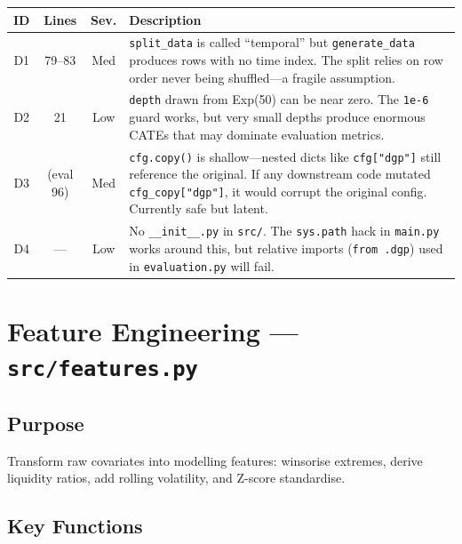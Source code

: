 \documentclass[11pt, letterpaper]{article}
\begin{document}
\begin{center}
\begin{tabularx}{\textwidth}{c c c X}
    \toprule
    \textbf{ID} & \textbf{Lines} & \textbf{Sev.} & \textbf{Description} \\
    \midrule
    D1 & 79--83 & \textcolor{medsev}{Med} &
        \texttt{split\_data} is called ``temporal'' but \texttt{generate\_data} produces rows with no time index. The split relies on row order never being shuffled---a fragile assumption. \\
    D2 & 21 & \textcolor{lowsev}{Low} &
        \texttt{depth} drawn from Exp(50) can be near zero. The \texttt{1e-6} guard works, but very small depths produce enormous CATEs that may dominate evaluation metrics. \\
    D3 & (eval 96) & \textcolor{medsev}{Med} &
        \texttt{cfg.copy()} is shallow---nested dicts like \texttt{cfg["dgp"]} still reference the original. If any downstream code mutated \texttt{cfg\_copy["dgp"]}, it would corrupt the original config. Currently safe but latent. \\
    D4 & --- & \textcolor{lowsev}{Low} &
        No \texttt{\_\_init\_\_.py} in \texttt{src/}. The \texttt{sys.path} hack in \texttt{main.py} works around this, but relative imports (\texttt{from .dgp}) used in \texttt{evaluation.py} will fail. \\
    \bottomrule
\end{tabularx}
\end{center}


\newpage
\section{Feature Engineering --- \texttt{src/features.py}}
\label{sec:features}

\subsection{Purpose}
Transform raw covariates into modelling features: winsorise extremes, derive liquidity ratios, add rolling volatility, and Z-score standardise.

\subsection{Key Functions}
\end{document}

